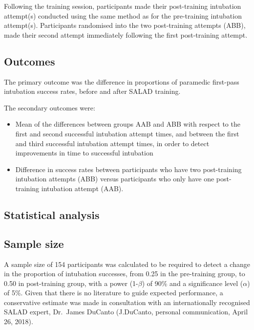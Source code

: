\documentclass[]{article}
\providecommand{\tightlist}{%
  \setlength{\itemsep}{0pt}\setlength{\parskip}{0pt}}
\begin{document}
Following the training session, participants made their post-training
intubation attempt(s) conducted using the same method as for the
pre-training intubation attempt(s). Participants randomised into the two
post-training attempts (ABB), made their second attempt immediately
following the first post-training attempt.

\hypertarget{outcomes}{%
\subsection{Outcomes}\label{outcomes}}

The primary outcome was the difference in proportions of paramedic
first-pass intubation success rates, before and after SALAD training.

The secondary outcomes were:

\begin{itemize}
\tightlist
\item
  Mean of the differences between groups AAB and ABB with respect to the
  first and second successful intubation attempt times, and between the
  first and third successful intubation attempt times, in order to
  detect improvements in time to successful intubation
\item
  Difference in success rates between participants who have two
  post-training intubation attempts (ABB) versus participants who only
  have one post-training intubation attempt (AAB).
\end{itemize}

\hypertarget{statistical-analysis}{%
\subsection{Statistical analysis}\label{statistical-analysis}}

\hypertarget{sample-size}{%
\subsection{Sample size}\label{sample-size}}

A sample size of 154 participants was calculated to be required to
detect a change in the proportion of intubation successes, from 0.25 in
the pre-training group, to 0.50 in post-training group, with a power
(1-\(\beta\)) of 90\% and a significance level (\(\alpha\)) of 5\%.
Given that there is no literature to guide expected performance, a
conservative estimate was made in consultation with an internationally
recognised SALAD expert, Dr.~James DuCanto (J.DuCanto, personal
communication, April 26, 2018).
\end{document}
